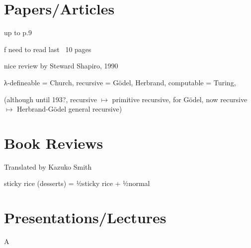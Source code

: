 \documentclass[
	fontsize=10pt, %
	twoside=false, %
	secnumdepth=-1, %
]{kaobook}
\theoremstyle{break}
\begin{document}
\listoftables %

\endgroup


\mainmatter %

\chapter{Papers/Articles}
up to p.9

f
    need to read last ~10 pages

    nice review by Steward Shapiro, 1990

    λ-defineable = Church,
    recursive = Gödel, Herbrand,
    computable = Turing,

    (although until 193?, recursive $↦$ primitive recursive, for Gödel,
    now recursive $↦$ Herbrand-Gödel general recursive)
\chapter{Book Reviews}
    Translated by Kazuko Smith

    sticky rice (desserts) = ½sticky rice + ½normal
\chapter{Presentations/Lectures}
    A
\end{document}
